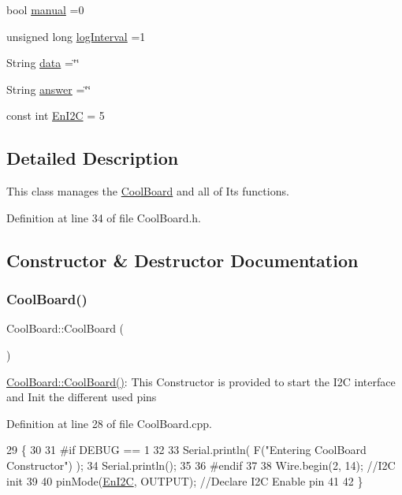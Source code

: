 \begin{DoxyCompactItemize}
\item 
bool \hyperlink{class_cool_board_a7c8e505a5804b109e112d5a03df6ea2b}{manual} =0
\item 
unsigned long \hyperlink{class_cool_board_a84bc94413b64973e4aba8c467c97006c}{log\+Interval} =1
\item 
String \hyperlink{class_cool_board_a427fb753dd8575bdf821c70a5c63d695}{data} =\char`\"{}\char`\"{}
\item 
String \hyperlink{class_cool_board_a7b835fafd449e5282f7f91d787a2dc15}{answer} =\char`\"{}\char`\"{}
\item 
const int \hyperlink{class_cool_board_af1fe1376fc66f93dee80b327ca695377}{En\+I2C} = 5
\end{DoxyCompactItemize}


\subsection{Detailed Description}
This class manages the \hyperlink{class_cool_board}{Cool\+Board} and all of Its functions. 

Definition at line 34 of file Cool\+Board.\+h.



\subsection{Constructor \& Destructor Documentation}
\mbox{\label{class_cool_board_a8b88fd781e22e93025dd63474113b7e4}} 
\subsubsection{\texorpdfstring{Cool\+Board()}{CoolBoard()}}
{\footnotesize\ttfamily Cool\+Board\+::\+Cool\+Board (\begin{DoxyParamCaption}{ }\end{DoxyParamCaption})}

\hyperlink{class_cool_board_a8b88fd781e22e93025dd63474113b7e4}{Cool\+Board\+::\+Cool\+Board()}\+: This Constructor is provided to start the I2C interface and Init the different used pins 

Definition at line 28 of file Cool\+Board.\+cpp.


\begin{DoxyCode}
29 \{
30 
31 \textcolor{preprocessor}{#if DEBUG == 1}
32 
33     Serial.println( F(\textcolor{stringliteral}{"Entering CoolBoard Constructor"}) );
34     Serial.println();
35 
36 \textcolor{preprocessor}{#endif}
37     
38     Wire.begin(2, 14);                       \textcolor{comment}{//I2C init }
39 
40     pinMode(\hyperlink{class_cool_board_af1fe1376fc66f93dee80b327ca695377}{EnI2C}, OUTPUT);           \textcolor{comment}{//Declare I2C Enable pin }
41 
42 \}
\end{DoxyCode}


